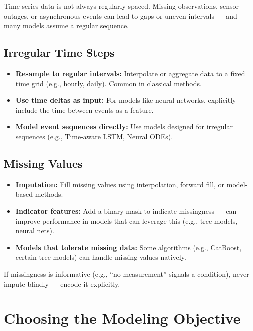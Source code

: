 \documentclass[12pt,openany, draft]{book}
\begin{document}
Time series data is not always regularly spaced. Missing observations, sensor outages, or asynchronous events can lead to gaps or uneven intervals — and many models assume a regular sequence.


\subsection*{Irregular Time Steps}

\begin{itemize}
    \item \textbf{Resample to regular intervals:} Interpolate or aggregate data to a fixed time grid (e.g., hourly, daily). Common in classical methods.
    \item \textbf{Use time deltas as input:} For models like neural networks, explicitly include the time between events as a feature.
    \item \textbf{Model event sequences directly:} Use models designed for irregular sequences (e.g., Time-aware LSTM, Neural ODEs).
\end{itemize}


\subsection*{Missing Values}

\begin{itemize}
    \item \textbf{Imputation:} Fill missing values using interpolation, forward fill, or model-based methods.
    \item \textbf{Indicator features:} Add a binary mask to indicate missingness — can improve performance in models that can leverage this (e.g., tree models, neural nets).
    \item \textbf{Models that tolerate missing data:} Some algorithms (e.g., CatBoost, certain tree models) can handle missing values natively.
\end{itemize}

\begin{notebox}
If missingness is informative (e.g., “no measurement” signals a condition), never impute blindly — encode it explicitly.
\end{notebox}



\section{Choosing the Modeling Objective}
\end{document}
